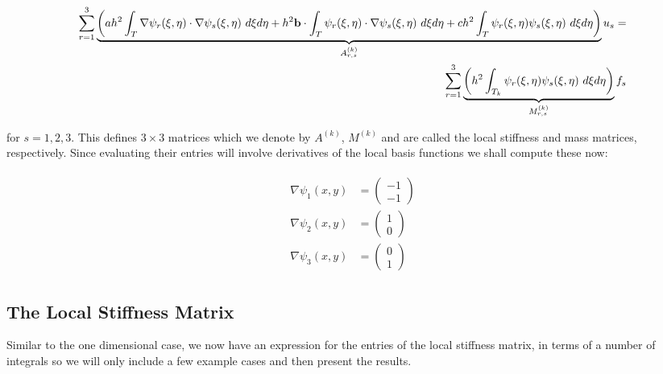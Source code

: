 \begin{align}\label{eq:twod-deterministic-discrete-local}
    \begin{split}
    \sum_{r=1}^3\underbrace{
      \left(
        ah^2\int_{T}\nabla\psi_r(\xi, \eta)\cdot\nabla\psi_s(\xi, \eta)\ d\xi d\eta
        + h^2\v{b} \cdot \int_{T}\psi_r(\xi,\eta)\cdot\nabla\psi_s(\xi,\eta)\ d\xi d\eta
        + ch^2\int_{T}\psi_r(\xi,\eta)\psi_s(\xi,\eta)\ d\xi d\eta
      \right)}_{A^{(k)}_{r,s}}u_s = \\
    \sum_{r=1}^3\underbrace{\left(
        h^2\int_{T_k}\psi_r(\xi,\eta)\psi_s(\xi,\eta)\ d\xi d\eta
    \right)}_{M^{(k)}_{r,s}}f_s
    \end{split}
\end{align}

for $s = 1,2,3$. This defines $3 \times 3$ matrices which we denote by
$A^{(k)}$, $M^{(k)}$ and are called the local stiffness and mass matrices,
respectively. Since evaluating their entries will involve derivatives of the
local basis functions we shall compute these now:

\begin{align}
    \begin{split}
        \nabla\psi_1(x, y) &= \left(\begin{array}{c} -1 \\ -1 \end{array}\right) \\
        \nabla\psi_2(x, y) &= \left(\begin{array}{c} 1 \\ 0 \end{array}\right) \\
        \nabla\psi_3(x, y) &= \left(\begin{array}{c} 0 \\ 1 \end{array}\right)
    \end{split}
\end{align}

\subsection{The Local Stiffness Matrix}\label{sec:twod-deterministic-local-stiffness}

Similar to the one dimensional case, we now have an expression for the entries
of the local stiffness matrix, in terms of a number of integrals
 so we will only include a few
example cases and then present the results.

